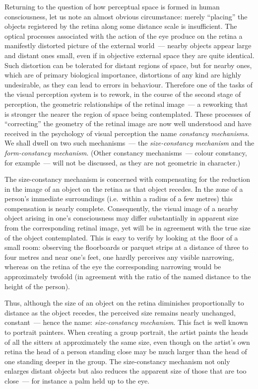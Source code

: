 Returning to the question of how perceptual space is formed in human consciousness,
let us note an almost obvious circumstance: merely ``placing'' the objects registered by
the retina along some distance scale is insufficient.  The optical processes associated
with the action of the eye produce on the retina a manifestly distorted picture of the
external world~--- nearby objects appear large and distant ones small, even if in
objective external space they are quite identical.  Such distortion can be tolerated for
distant regions of space, but for nearby ones, which are of primary biological
importance, distortions of any kind are highly undesirable, as they can lead to errors in
behaviour.  Therefore one of the tasks of the visual perception system is to rework, in
the course of the second stage of perception, the geometric relationships of the retinal
image~--- a reworking that is stronger the nearer the region of space being
contemplated.  These processes of ``correcting'' the geometry of the retinal image are
now well understood and have received in the psychology of visual perception the name
\emph{constancy mechanisms}.  We shall dwell on two such mechanisms~--- the
\emph{size-constancy mechanism} and the \emph{form-constancy mechanism}. (Other
constancy mechanisms~--- colour constancy, for example~--- will not be discussed, as
they are not geometric in character.)

The size-constancy mechanism is concerned with compensating for the reduction in
the image of an object on the retina as that object recedes.  In the zone of a person's
immediate surroundings (i.e.\ within a radius of a few metres) this compensation is
nearly complete.  Consequently, the visual image of a nearby object arising in one's
consciousness may differ substantially in apparent size from the corresponding retinal
image, yet will be in agreement with the true size of the object contemplated.  This is
easy to verify by looking at the floor of a small room: observing the floorboards or
parquet strips at a distance of three to four metres and near one's feet, one hardly
perceives any visible narrowing, whereas on the retina of the eye the corresponding
narrowing would be approximately twofold (in agreement with the ratio of the named
distance to the height of the person).


Thus, although the size of an object on the retina diminishes proportionally to distance
as the object recedes, the perceived size remains nearly unchanged, constant~--- hence
the name: \emph{size-constancy mechanism}.  This fact is well known to portrait
painters.  When creating a group portrait, the artist paints the heads of all the sitters
at approximately the same size, even though on the artist's own retina the head of a
person standing close may be much larger than the head of one standing deeper in the
group.  The size-constancy mechanism not only enlarges distant objects but also reduces
the apparent size of those that are too close~--- for instance a palm held up to the eye.

